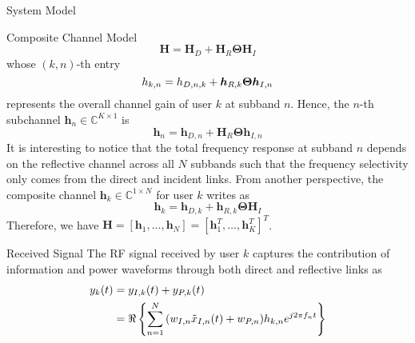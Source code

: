 \documentclass{IEEEtran}
\begin{document}
\begin{section} {System Model}
\begin{subsection}	{Composite Channel Model}
\begin{equation}
			\boldsymbol{H} = \boldsymbol{H}_D+\boldsymbol{H}_R\boldsymbol{\Theta}\boldsymbol{H}_I
		\end{equation}
		whose $(k,n)$-th entry
		\begin{equation}	\label{eq:h_{k,n}}
			h_{k,n}=h_{D,n,k}+\boldsymbol{h}_{R,k}\boldsymbol{\Theta}\boldsymbol{h}_{I,n}
		\end{equation}
		represents the overall channel gain of user $k$ at subband $n$. Hence, the $n$-th subchannel $\boldsymbol{h}_n \in \mathbb{C}^{K \times 1}$ is
		\begin{equation}	\label{eq:h_n}
			\boldsymbol{h}_n=\boldsymbol{h}_{D,n}+\boldsymbol{H}_{R}\boldsymbol{\Theta}\boldsymbol{h}_{I,n}
		\end{equation}
		It is interesting to notice that the total frequency response at subband $n$ depends on the reflective channel across all $N$ subbands such that the frequency selectivity only comes from the direct and incident links. From another perspective, the composite channel $\boldsymbol{h}_k \in \mathbb{C}^{1 \times N}$ for user $k$ writes as
		\begin{equation}	\label{eq:h_k}
			\boldsymbol{h}_k=\boldsymbol{h}_{D,k}+\boldsymbol{h}_{R,k}\boldsymbol{\Theta}\boldsymbol{H}_I
		\end{equation}
		Therefore, we have $\boldsymbol{H}=[\boldsymbol{h}_1,\dots,\boldsymbol{h}_N]=[\boldsymbol{h}_1^T,\dots,\boldsymbol{h}_K^T]^T$.
	\end{subsection}

	\begin{subsection}	{Received Signal}
		The RF signal received by user $k$ captures the contribution of information and power waveforms through both direct and reflective links as
		\begin{equation}	\label{eq:y_{k}(t)}
			\begin{split}
				y_{k}(t)
				&=y_{I,k}(t)+y_{P,k}(t)	\\
				&=\Re\left\{{\sum_{n=1}^N{(w_{I,n}\tilde{x}_{I,n}(t)+w_{P,n})h_{k,n}e^{j2{\pi}{f_n}t}}}\right\}
			\end{split}
		\end{equation}
	\end{subsection}


\end{section}
\end{document}
